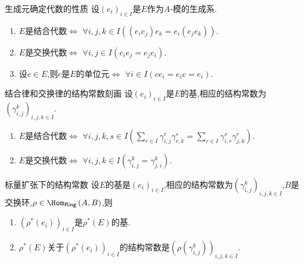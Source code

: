 \begin{proposition}{生成元确定代数的性质}{}
	设$\left(e_{i}\right)_{i\in I}$是$E$作为$A$-模的生成系.
	\begin{enumerate}
		\item $E$是结合代数$\iff$ $\forall i,j,k\in I\left(\left(e_{i}e_{j}\right)e_{k}=e_{i}\left(e_{j}e_{k}\right)\right)$.
		\item $E$是交换代数$\iff$ $\forall i,j\in I\left(e_{i}e_{j}=e_{j}e_{i}\right)$.
		\item 设$c\in E$,则$c$是$E$的单位元$\iff$ $\forall i\in I\left(ce_{i}=e_{i}c=e_{i}\right)$.
	\end{enumerate}
\end{proposition}

\begin{proposition}{结合律和交换律的结构常数刻画}{}
	设$\left(e_{i}\right)_{i\in I}$是$E$的基,相应的结构常数为$\left(\gamma_{i,j}^{k}\right)_{i,j,k\in I}$.
	\begin{enumerate}
		\item $E$是结合代数$\iff$ $\forall i,j,k,s\in I\left(\sum\limits_{r\in I}\gamma_{i,j}^{r}\gamma_{r,k}^{s}=\sum\limits_{r\in I}\gamma_{i,r}^{s}\gamma_{j,k}^{r}\right)$.
		\item $E$是交换代数$\iff$ $\forall i,j,k\in I\left(\gamma_{i,j}^{k}=\gamma_{j,i}^{k}\right)$.
	\end{enumerate}
\end{proposition}

\begin{proposition}{标量扩张下的结构常数}{}
	设$E$的基是$\left(e_{i}\right)_{i\in I}$,相应的结构常数为$\left(\gamma_{i,j}^{k}\right)_{i,j,k\in I}$,$B$是交换环,$\rho\in\Hom_{\mathsf{Ring}}\left(A,B\right)$,则
	\begin{enumerate}
		\item $\left(\rho^{\ast}\left(e_{i}\right)\right)_{i\in I}$是$\rho^{\ast}\left(E\right)$的基.
		\item $\rho^{\ast}\left(E\right)$关于$\left(\rho^{\ast}\left(e_{i}\right)\right)_{i\in I}$的结构常数是$\left(\rho\left(\gamma_{i,j}^{k}\right)\right)_{i,j,k\in I}$.
	\end{enumerate}
\end{proposition}
